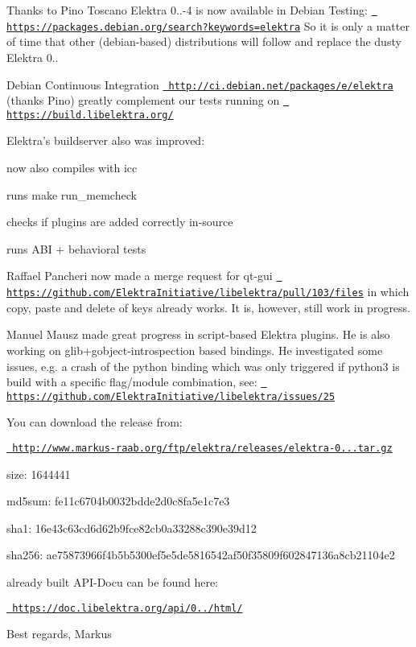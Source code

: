 Thanks to Pino Toscano Elektra 0..-\/4 is now available in Debian Testing\+: \href{https://packages.debian.org/search?keywords=elektra}{\texttt{ https\+://packages.\+debian.\+org/search?keywords=elektra}} So it is only a matter of time that other (debian-\/based) distributions will follow and replace the dusty Elektra 0..

Debian Continuous Integration \href{http://ci.debian.net/packages/e/elektra}{\texttt{ http\+://ci.\+debian.\+net/packages/e/elektra}} (thanks Pino) greatly complement our tests running on \href{https://build.libelektra.org/}{\texttt{ https\+://build.\+libelektra.\+org/}}

Elektra’s buildserver also was improved\+:


\begin{DoxyItemize}
\item now also compiles with icc
\item runs {\ttfamily make run\+\_\+memcheck}
\item checks if plugins are added correctly in-\/source
\item runs A\+BI + behavioral tests
\end{DoxyItemize}

Raffael Pancheri now made a merge request for qt-\/gui \href{https://github.com/ElektraInitiative/libelektra/pull/103/files}{\texttt{ https\+://github.\+com/\+Elektra\+Initiative/libelektra/pull/103/files}} in which copy, paste and delete of keys already works. It is, however, still work in progress.

Manuel Mausz made great progress in script-\/based Elektra plugins. He is also working on glib+gobject-\/introspection based bindings. He investigated some issues, e.\+g. a crash of the python binding which was only triggered if python3 is build with a specific flag/module combination, see\+: \href{https://github.com/ElektraInitiative/libelektra/issues/25}{\texttt{ https\+://github.\+com/\+Elektra\+Initiative/libelektra/issues/25}}

You can download the release from\+:

\href{http://www.markus-raab.org/ftp/elektra/releases/elektra-0.8.8.tar.gz}{\texttt{ http\+://www.\+markus-\/raab.\+org/ftp/elektra/releases/elektra-\/0...\+tar.\+gz}}


\begin{DoxyItemize}
\item size\+: 1644441
\item md5sum\+: fe11c6704b0032bdde2d0c8fa5e1c7e3
\item sha1\+: 16e43c63cd6d62b9fce82cb0a33288c390e39d12
\item sha256\+: ae75873966f4b5b5300ef5e5de5816542af50f35809f602847136a8cb21104e2
\end{DoxyItemize}

already built A\+P\+I-\/\+Docu can be found here\+:

\href{https://doc.libelektra.org/api/0.8.8/html/}{\texttt{ https\+://doc.\+libelektra.\+org/api/0../html/}}

Best regards, Markus 